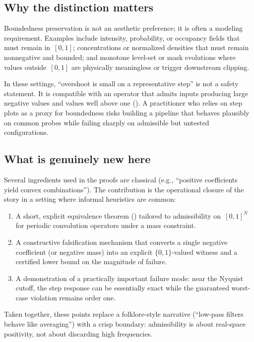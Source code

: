 \documentclass[11pt,a4paper]{article}
\theoremstyle{plain}
\theoremstyle{definition}
\theoremstyle{plain}
\begin{document}
\subsection{Why the distinction matters}

Boundedness preservation is not an aesthetic preference; it is often a modeling
requirement.  Examples include intensity, probability, or occupancy fields that
must remain in~$[0,1]$; concentrations or normalized densities that must remain
nonnegative and bounded; and monotone level-set or mask evolutions where values
outside~$[0,1]$ are physically meaningless or trigger downstream clipping.

In these settings, ``overshoot is small on a representative step'' is not a
safety statement.  It is compatible with an operator that admits inputs producing
large negative values and values well above one ().  A
practitioner who relies on step plots as a proxy for boundedness risks building a
pipeline that behaves plausibly on common probes while failing sharply on
admissible but untested configurations.


\subsection{What is genuinely new here}

Several ingredients used in the proofs are classical (e.g., ``positive
coefficients yield convex combinations'').  The contribution is the operational
closure of the story in a setting where informal heuristics are common:

\begin{enumerate}[label=\arabic*.,leftmargin=2em]
  \item A short, explicit equivalence theorem () tailored to
    admissibility on~$[0,1]^N$ for periodic convolution operators under a mass
    constraint.
  \item A constructive falsification mechanism that converts a single negative
    coefficient (or negative mass) into an explicit $\{0,1\}$-valued witness and
    a certified lower bound on the magnitude of failure.
  \item A demonstration of a practically important failure mode: near the
    Nyquist cutoff, the step response can be essentially exact while the
    guaranteed worst-case violation remains order one.
\end{enumerate}

Taken together, these points replace a folklore-style narrative (``low-pass
filters behave like averaging'') with a crisp boundary: admissibility is about
real-space positivity, not about discarding high frequencies.
\end{document}
